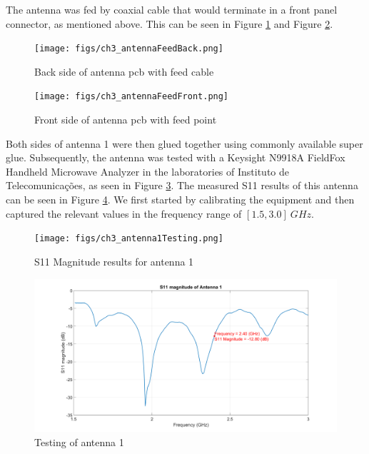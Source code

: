 \par The antenna was fed by coaxial cable that would terminate in a front panel connector, as mentioned above. This can be seen in Figure \ref{fig:ch3_antennaFeedBack.png} and Figure \ref{fig:ch3_antennaFeedFront.png}.

\begin{figure}[H]
    \vspace*{0cm}
    \centering
    \texttt{[image: figs/ch3\_antennaFeedBack.png]}
    \caption{Back side of antenna \ac{pcb} with feed cable}
    \label{fig:ch3_antennaFeedBack.png}
\end{figure}

\begin{figure}[H]
    \vspace*{0cm}
    \centering
    \texttt{[image: figs/ch3\_antennaFeedFront.png]}
    \caption{Front side of antenna \ac{pcb} with feed point}
    \label{fig:ch3_antennaFeedFront.png}
\end{figure}

\par Both sides of antenna 1 were then glued together using commonly available super glue. Subsequently, the antenna was tested with a Keysight N9918A FieldFox Handheld Microwave Analyzer in the laboratories of Instituto de Telecomunicações, as seen in Figure \ref{fig:ch3_antenna1Testing.png}. The measured S11 results of this antenna can be seen in Figure \ref{fig:ch3_s11magAnt1.png}. We first started by calibrating the equipment and then captured the relevant values in the frequency range of $[1.5, 3.0] \:\si{GHz}$.

\begin{figure}[H]
    \vspace*{0cm}
    \centering
    \texttt{[image: figs/ch3\_antenna1Testing.png]}
    \caption{S11 Magnitude results for antenna 1}
    \label{fig:ch3_antenna1Testing.png}
\end{figure}

\begin{figure}[H]
    \vspace*{0cm}
    \centering
    \includegraphics[width=1\linewidth]{figs/ch3_s11magAnt1.png}
    \caption{Testing of antenna 1}
    \label{fig:ch3_s11magAnt1.png}
\end{figure}

